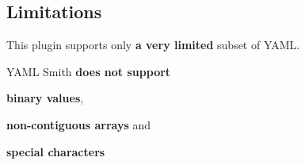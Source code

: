 \subsection*{Limitations}


\begin{DoxyItemize}
\item This plugin supports only {\bfseries a very limited} subset of Y\+A\+ML.
\item Y\+A\+ML Smith {\bfseries does not support}
\begin{DoxyItemize}
\item {\bfseries binary values},
\item {\bfseries non-\/contiguous arrays} and
\item {\bfseries special characters}
\end{DoxyItemize}
\end{DoxyItemize}